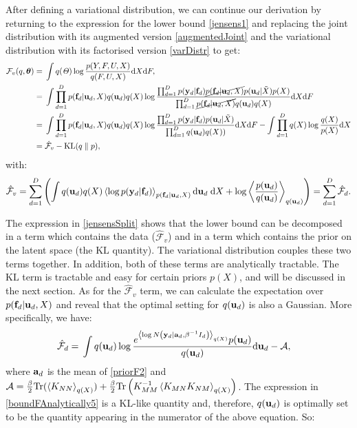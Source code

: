 \documentclass [10pt , a4paper]{article}
\begin{document}
\par After defining a variational distribution, we can continue our derivation by returning to
the expression for the lower bound \eqref{jensens1} and replacing the joint distribution with
 its augmented version \eqref{augmentedJoint} and the variational distribution with its
 factorised version \eqref{varDistr} to get:
\begin{align}
\mathcal{F}_v(q, \boldsymbol \theta) = {}& \int q(\mathit{\Theta}) \log 
		\frac{ p(Y,F, U,X)}
			 {q(F, U,X)}  \text{d}  X \text{d} F,
 	    \nonumber \\
= {}& \int \prod_{d=1}^D p(\mathbf{f}_d | \mathbf{u}_d, X )q(\mathbf{u}_d) q(X) 
	    \log  \frac{\prod_{d=1}^D p(\mathbf{y}_d | \mathbf{f}_d) \cancel{p(\mathbf{f}_d | \mathbf{u}_d, \mathit{X})}
						p(\mathbf{u}_d | \tilde{X})  p(X )}
 	      		   {\prod_{d=1}^D \cancel{p(\mathbf{f}_d | \mathbf{u}_d, X )}q(\mathbf{u}_d) q(X)}   \text{d}  X \text{d} F \nonumber \\
= {}& \int \prod_{d=1}^D p(\mathbf{f}_d | \mathbf{u}_d, X )q(\mathbf{u}_d) q(X) 
		\log  \frac{\prod_{d=1}^D p(\mathbf{y}_d | \mathbf{f}_d) p(\mathbf{u}_d | \tilde{X})}
				   {\prod_{d=1}^D q(\mathbf{u}_d) q(X))}   \text{d}  X \text{d} F
-  \int \prod_{d=1}^D  q(X)   \log \frac{q(X)}{p(X )}   \text{d}  X \nonumber \\
= {}& \hat{\mathcal{F}}_v - \text{KL}(q \parallel p), \label{jensensSplit}
\end{align}
%
with:
 \begin{equation}
\label{Fd}
\hat{\mathcal{F}}_v = 
\sum_{d=1}^D \left( 
    \int q(\mathbf{u}_d) q(X) \left\langle \log p(\mathbf{y}_d | \mathbf{f}_d) \right\rangle_{p(\mathbf{f}_d | \mathbf{u}_d, X)} \text{d} \mathbf{u}_d \; \text{d} X +
					   \log \left\langle \frac{p(\mathbf{u}_d)}{q(\mathbf{u}_d)} \right\rangle_{q(\mathbf{u}_d)} 
  \right) = \sum_{d=1}^D \hat{\mathcal{F}}_d .
\end{equation} 

\noindent The expression in \eqref{jensensSplit} shows that the lower bound can be decomposed in a term which contains
the data ($\hat{\mathcal{F}}_v$) and in a term which contains the prior on the latent space
(the $\text{KL}$ quantity). The variational distribution couples these two terms together. In addition,
both of these terms are analytically tractable. The $\text{KL}$ term
is tractable and easy for certain priors $p(X)$, and will be discussed in the next section. 
As for the $\hat{\mathcal{F}}_v$ term, we can calculate the
expectation over $p(\mathbf{f}_d | \mathbf{u}_d,X)$ and reveal that the optimal setting for $q(\mathbf{u}_d)$ is 
also a Gaussian. More specifically, we have:
\begin{align}
\hat{\mathcal{F}}_d={}& \int q(\mathbf{u}_d) \log \frac{e^{\left\langle \log N \left( \mathbf{y}_d | \mathbf{a}_d, \beta^{-1} I_d \right) \right\rangle_{q(X)}}
		p(\mathbf{u}_d)}{q(\mathbf{u}_d)} \text{d} \mathbf{u}_d - \mathcal{A} , \label{boundFAnalytically5}
\end{align}
where $\mathbf{a}_d$ is the mean of \eqref{priorF2} and 
$\mathcal{A}=\frac{\beta}{2} \text{Tr}(\left\langle K_{NN} \right\rangle_{q(X)}) +
	 	\frac{\beta}{2} \text{Tr} \left(K_{MM}^{-1} \left\langle K_{MN} K_{NM} \right\rangle_{q(X)} \right) $.
The expression in \eqref{boundFAnalytically5} is a KL-like quantity and, therefore, $q(\mathbf{u}_d)$ is optimally set to be the quantity 
appearing in the numerator of the above equation. So:
\end{document}
